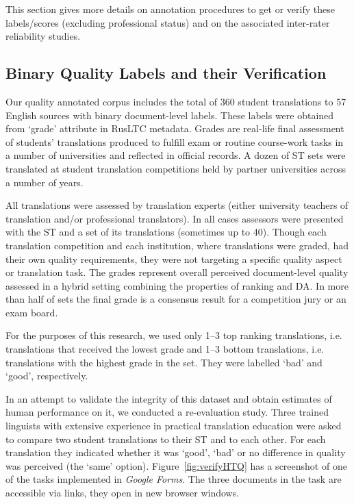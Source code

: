 This section gives more details on annotation procedures to get or verify these labels/scores (excluding professional status) and on the associated inter-rater reliability studies.

\subsection{\label{ssec:binary}Binary Quality Labels and their Verification}

Our quality annotated corpus includes the total of 360 student translations to 57 English sources with binary document-level labels. These labels were obtained from `grade' attribute in \gls{RusLTC} metadata. Grades are real-life final assessment of students' translations produced to fulfill exam or routine course-work tasks in a number of universities and reflected in official records. A dozen of ST sets were translated at student translation competitions held by partner universities across a number of years. 

All translations were assessed by translation experts (either university teachers of translation and/or professional translators). In all cases assessors were presented with the ST and a set of its translations (sometimes up to 40). Though each translation competition and each institution, where translations were graded, had their own quality requirements, they were not targeting a specific quality aspect or translation task. The grades represent overall perceived document-level quality assessed in a hybrid setting combining the properties of ranking and DA. In more than half of sets the final grade is a consensus result for a competition jury or an exam board. 

For the purposes of this research, we used only 1--3 top ranking translations, i.e. translations that received the lowest grade and 1--3 bottom translations, i.e. translations with the highest grade in the set. They were labelled `bad' and `good', respectively.

In an attempt to validate the integrity of this dataset and obtain estimates of human performance on it, we conducted a re-evaluation study. Three trained linguists with extensive experience in practical translation education were asked to compare two student translations to their ST and to each other.
For each translation they indicated whether it was `good', `bad' or no difference in quality was perceived (the `same' option). Figure~\ref{fig:verifyHTQ} has a screenshot of one of the tasks implemented in \textit{Google Forms}. The three documents in the task are accessible via links, they open in new browser windows.

